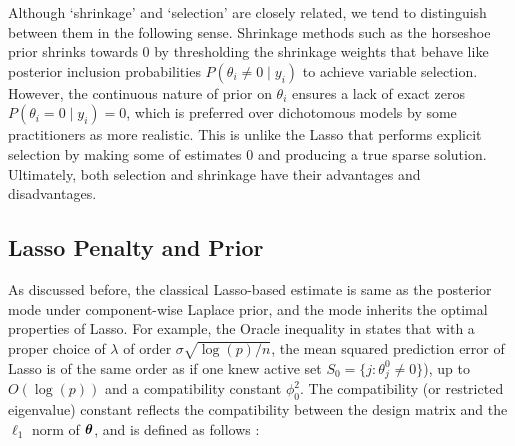 \documentclass[sts,preprint]{imsart}
\begin{document}
Although `shrinkage' and `selection' are closely related, we tend to distinguish between them in the following sense. Shrinkage methods such as the horseshoe prior shrinks towards 0 by thresholding the shrinkage weights that behave like posterior inclusion probabilities $P(\theta_i \neq 0 \mid y_i)$ to achieve variable selection. 
However, the continuous nature of prior on $\theta_i$ ensures a lack of exact zeros $P(\theta_i = 0 
\mid y_i) = 0$, which is preferred over dichotomous models by some practitioners \citep{stephens2009bayesian} as more realistic.  This is unlike the Lasso that performs explicit selection by making some of estimates 0 and producing a true sparse solution. Ultimately, both selection and shrinkage have their advantages and disadvantages. 


\subsection{Lasso Penalty and Prior}\label{sec:lasso}

%

As discussed before, the classical Lasso-based estimate is same as the posterior mode under component-wise Laplace prior, and the mode inherits the optimal properties of Lasso. For example, the Oracle inequality in \citet[Eq. (2.8), Th. (6.1)]{buhlmann2011statistics} states that with a proper choice of $\lambda$ of order $\sigma \sqrt{\log(p)/n}$, the mean squared prediction error of Lasso is of the same order as if one knew active set $S_0 = \{j : \theta_j^0 \neq 0 \}$), up to $O(\log(p))$ and a compatibility constant $\phi_0^2$. The compatibility (or restricted eigenvalue) constant reflects the compatibility between the design matrix and the $\ell_1$ norm of $\boldsymbol{\theta}$, and is defined as follows \citep[Eq (6.4)]{buhlmann2011statistics}:
\end{document}

